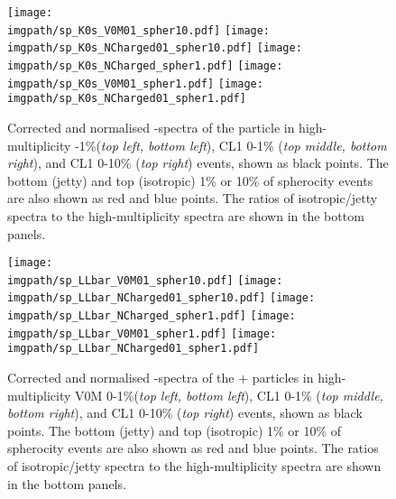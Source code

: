 \begin{figure}%
\centering%
\texttt{[image: \\imgpath/sp\_K0s\_V0M01\_spher10.pdf]}
\texttt{[image: \\imgpath/sp\_K0s\_NCharged01\_spher10.pdf]}
\texttt{[image: \\imgpath/sp\_K0s\_NCharged\_spher1.pdf]}
\texttt{[image: \\imgpath/sp\_K0s\_V0M01\_spher1.pdf]}
\texttt{[image: \\imgpath/sp\_K0s\_NCharged01\_spher1.pdf]}
  \caption{Corrected and normalised \pt -spectra of the \KOs particle in high-multiplicity -1\%(\textit{top left, bottom left}), CL1 0-1\% (\textit{top middle, bottom right}), and CL1 0-10\% (\textit{top right}) events, shown as black points. The bottom (jetty) and top (isotropic) 1\% or 10\% of spherocity events are also shown as red and blue points. The ratios of isotropic/jetty spectra to the high-multiplicity spectra are shown in the bottom panels.}
\label{fig:sphero:k0spt}
\end{figure}

\begin{figure}%
\centering%
\texttt{[image: \\imgpath/sp\_LLbar\_V0M01\_spher10.pdf]}
\texttt{[image: \\imgpath/sp\_LLbar\_NCharged01\_spher10.pdf]}
\texttt{[image: \\imgpath/sp\_LLbar\_NCharged\_spher1.pdf]}
\texttt{[image: \\imgpath/sp\_LLbar\_V0M01\_spher1.pdf]}
\texttt{[image: \\imgpath/sp\_LLbar\_NCharged01\_spher1.pdf]}
  \caption{Corrected and normalised \pt -spectra of the \LA + \AL particles in high-multiplicity V0M 0-1\%(\textit{top left, bottom left}), CL1 0-1\% (\textit{top middle, bottom right}), and CL1 0-10\% (\textit{top right}) events, shown as black points. The bottom (jetty) and top (isotropic) 1\% or 10\% of spherocity events are also shown as red and blue points. The ratios of isotropic/jetty spectra to the high-multiplicity spectra are shown in the bottom panels.}
\label{fig:sphero:lpt}
\end{figure}
